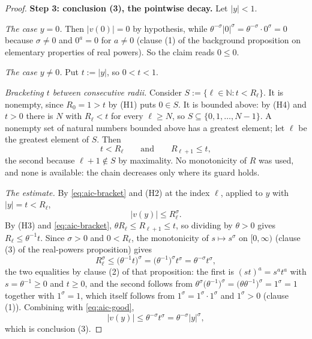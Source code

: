 \begin{proof}
\medskip\noindent\textbf{Step 3: conclusion (3), the pointwise decay.}
Let $\lvert y\rvert<1$.

\emph{The case $y=0$.}  Then $\lvert v(0)\rvert=0$ by hypothesis, while
$\theta^{-\sigma}\lvert 0\rvert^{\sigma}=\theta^{-\sigma}\cdot0^{\sigma}=0$ because
$\sigma\ne0$ and $0^{a}=0$ for $a\ne0$ (clause (1) of the background proposition on elementary
properties of real powers).  So the claim reads $0\le0$.

\emph{The case $y\ne0$.}  Put $t:=\lvert y\rvert$, so $0<t<1$.

\emph{Bracketing $t$ between consecutive radii.}  Consider
$S:=\{\ell\in\mathbb{N}:t<R_\ell\}$.  It is nonempty, since $R_0=1>t$ by (H1) puts $0\in S$.
It is bounded above: by (H4) and $t>0$ there is $N$ with $R_\ell<t$ for every $\ell\ge N$, so
$S\subseteq\{0,1,\ldots,N-1\}$.  A nonempty set of natural numbers bounded above has a greatest
element; let $\ell$ be the greatest element of $S$.  Then
\begin{equation}\label{eq:aic-bracket}
  t<R_\ell\qquad\text{and}\qquad R_{\ell+1}\le t,
\end{equation}
the second because $\ell+1\notin S$ by maximality.  No monotonicity of $R$ was used, and none
is available: the chain decreases only where its guard holds.

\emph{The estimate.}  By \eqref{eq:aic-bracket} and (H2) at the index $\ell$, applied to $y$
with $\lvert y\rvert=t<R_\ell$,
\begin{equation}\label{eq:aic-good}
  \lvert v(y)\rvert\le R_\ell^{\sigma}.
\end{equation}
By (H3) and \eqref{eq:aic-bracket}, $\theta R_\ell\le R_{\ell+1}\le t$, so dividing by
$\theta>0$ gives $R_\ell\le\theta^{-1}t$.  Since $\sigma>0$ and $0<R_\ell$, the monotonicity of
$s\mapsto s^{\sigma}$ on $[0,\infty)$ (clause (3) of the real-powers proposition) gives
\[
  R_\ell^{\sigma}\le\bigl(\theta^{-1}t\bigr)^{\sigma}
  =\bigl(\theta^{-1}\bigr)^{\sigma}t^{\sigma}=\theta^{-\sigma}t^{\sigma},
\]
the two equalities by clause (2) of that proposition: the first is
$(st)^{a}=s^{a}t^{a}$ with $s=\theta^{-1}\ge0$ and $t\ge0$, and the second follows from
$\theta^{\sigma}\bigl(\theta^{-1}\bigr)^{\sigma}=\bigl(\theta\theta^{-1}\bigr)^{\sigma}
=1^{\sigma}=1$ together with $1^{\sigma}=1$, which itself follows from
$1^{\sigma}=1^{\sigma}\cdot1^{\sigma}$ and $1^{\sigma}>0$ (clause (1)).  Combining with
\eqref{eq:aic-good},
\[
  \lvert v(y)\rvert\le\theta^{-\sigma}t^{\sigma}=\theta^{-\sigma}\lvert y\rvert^{\sigma},
\]
which is conclusion (3).
\end{proof}
